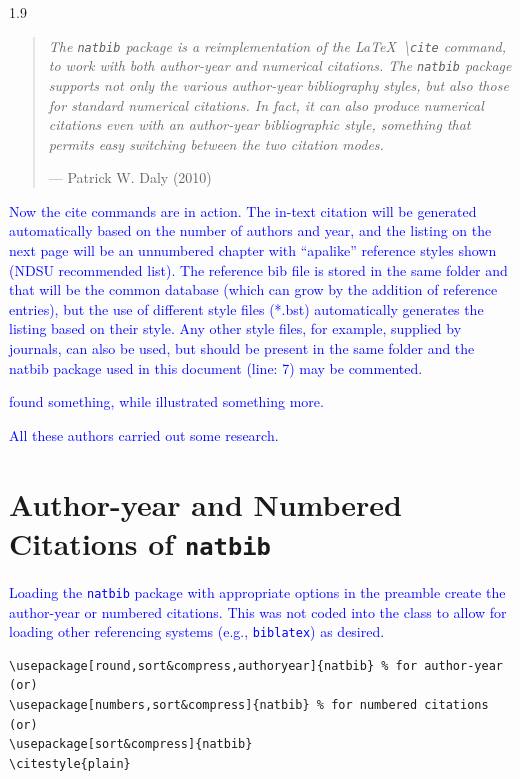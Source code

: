 \documentclass[phd]{ndsu-thesis-2022}
\newcommand\myspacing{1.9}      %
\newcommand\italk[1]{\textcolor{blue}{#1}}  %
\newcommand\cmd[1]{\textbackslash\texttt{#1}}  %
\begin{document}
\begin{spacing}{\myspacing}
\begin{quote}
\singlespacing
\raggedleft
\textit{The \texttt{natbib} package is a reimplementation of the \LaTeX\ \cmd{cite} command, to work with both author-year and numerical citations. The \texttt{natbib} package supports not only the various author-year bibliography styles, but also those for standard numerical citations. In fact, it can also produce numerical citations even with an author-year bibliographic style, something that permits easy switching between the two citation modes.} 

\hfill --- Patrick W. Daly (2010)
\end{quote}

\italk{Now the cite commands are in action. The in-text citation will be generated automatically based on the number of authors and year, and the listing on the next page will be an unnumbered chapter with ``apalike'' reference styles shown (NDSU recommended list). The reference bib file is stored in the same folder and that will be the common database (which can grow by the addition of reference entries), but the use of different style files (*.bst) automatically generates the listing based on their style. Any other style files, for example, supplied by journals, can also be used, but should be present in the same folder and the natbib package used in this document (line: 7) may be commented.}

\italk{\citet{calvo2004using} found something, while \citet{bari2016identification} illustrated something more. }

\italk{All these authors \citep{calvo2004using,cannayen2011latex,bari2016identification,sharma2012ndsu,baczkowski1990ndsu} carried out some research.} 

\section{Author-year and Numbered Citations of \texttt{natbib}}
\italk{Loading the \texttt{natbib} package with appropriate options in the preamble create the author-year or numbered citations. This was not coded into the class to allow for loading other referencing systems (e.g., \texttt{biblatex}) as desired.}

{\singlespacing
\begin{verbatim}
\usepackage[round,sort&compress,authoryear]{natbib} % for author-year
(or)
\usepackage[numbers,sort&compress]{natbib} % for numbered citations
(or)
\usepackage[sort&compress]{natbib} 
\citestyle{plain}
\end{verbatim}
}


\end{spacing}
\end{document}
